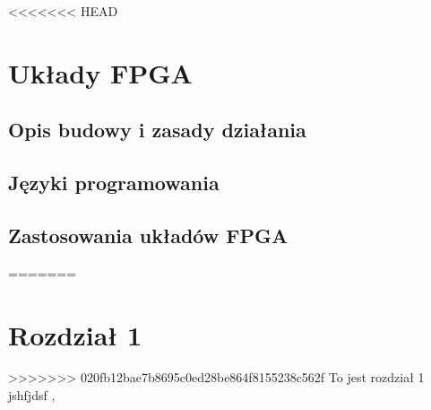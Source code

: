 \documentclass[document.tex]{subfiles}
\begin{document}
<<<<<<< HEAD
\chapter{Układy FPGA}
\section{Opis budowy i zasady działania}
\section{Języki programowania}
\section{Zastosowania układów FPGA}
=======
\chapter{Rozdział 1}
>>>>>>> 020fb12bae7b8695c0ed28be864f8155238c562f
To jest rozdział 1
jshfjdsf \cite{wikipedia1},\cite{goossens93}
\cite{wikipedia2}
\end{document}

